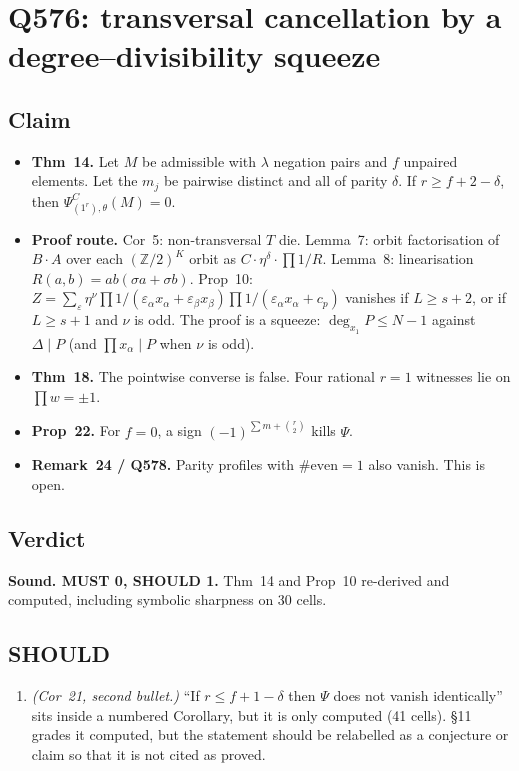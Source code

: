 \documentclass[11pt]{amsart}
\newcommand{\PsiC}{\Psi^{C}}
\newcommand{\Z}{\mathbb{Z}}
\begin{document}
\section{Q576: transversal cancellation by a degree--divisibility squeeze}

\subsection*{Claim}
\begin{itemize}[leftmargin=2em]
\item \textbf{Thm~14.} Let $M$ be admissible with $\lambda$ negation pairs and $f$ unpaired
elements. Let the $m_j$ be pairwise distinct and all of parity $\delta$. If $r\ge f+2-\delta$,
then $\PsiC_{(1^r),\theta}(M)=0$.
\item \textbf{Proof route.} Cor~5: non-transversal $T$ die. Lemma~7: orbit factorisation of
$B\cdot A$ over each $(\Z/2)^K$ orbit as $C\cdot\eta^\delta\cdot\prod 1/R$. Lemma~8:
linearisation $R(a,b)=ab(\sigma a+\sigma b)$. Prop~10:
$Z=\sum_\varepsilon \eta^\nu\prod 1/(\varepsilon_\alpha x_\alpha+\varepsilon_\beta x_\beta)
\prod 1/(\varepsilon_\alpha x_\alpha+c_p)$ vanishes if $L\ge s+2$, or if $L\ge s+1$ and $\nu$ is
odd. The proof is a squeeze: $\deg_{x_1}P\le N-1$ against $\Delta\mid P$ (and
$\prod x_\alpha\mid P$ when $\nu$ is odd).
\item \textbf{Thm~18.} The pointwise converse is false. Four rational $r=1$ witnesses lie on
$\prod w=\pm1$.
\item \textbf{Prop~22.} For $f=0$, a sign $(-1)^{\sum m+\binom r2}$ kills $\Psi$.
\item \textbf{Remark~24 / Q578.} Parity profiles with $\#\text{even}=1$ also vanish. This is open.
\end{itemize}

\subsection*{Verdict}
\textbf{Sound. MUST 0, SHOULD 1.} Thm~14 and Prop~10 re-derived and computed, including symbolic
sharpness on 30 cells.

\subsection*{SHOULD}
\begin{enumerate}[leftmargin=2em,label=\textbf{SHOULD-\arabic*.}]
\item \emph{(Cor~21, second bullet.)} ``If $r\le f+1-\delta$ then $\Psi$ does not vanish
identically'' sits inside a numbered Corollary, but it is only computed (41 cells). \S11 grades it
computed, but the statement should be relabelled as a conjecture or claim so that it is not cited
as proved.
\end{enumerate}
\end{document}
